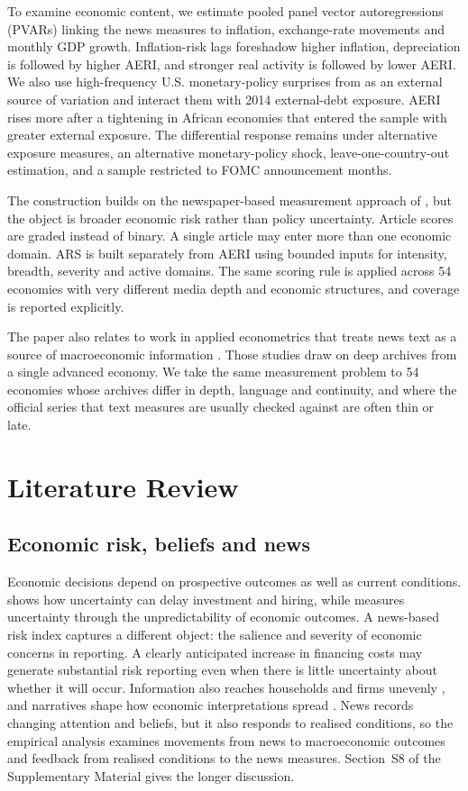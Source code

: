 \documentclass[12pt]{article}
\begin{document}
To examine economic content, we estimate pooled panel vector autoregressions (PVARs) linking the news measures to inflation, exchange-rate movements and monthly GDP growth. Inflation-risk lags foreshadow higher inflation, depreciation is followed by higher AERI, and stronger real activity is followed by lower AERI. We also use high-frequency U.S. monetary-policy surprises from \citet{jarocinski2020} as an external source of variation and interact them with 2014 external-debt exposure. AERI rises more after a tightening in African economies that entered the sample with greater external exposure. The differential response remains under alternative exposure measures, an alternative monetary-policy shock, leave-one-country-out estimation, and a sample restricted to FOMC announcement months.

The construction builds on the newspaper-based measurement approach of \citet{baker2016}, but the object is broader economic risk rather than policy uncertainty. Article scores are graded instead of binary. A single article may enter more than one economic domain. ARS is built separately from AERI using bounded inputs for intensity, breadth, severity and active domains. The same scoring rule is applied across 54 economies with very different media depth and economic structures, and coverage is reported explicitly.

The paper also relates to work in applied econometrics that treats news text as a source of macroeconomic information \citep{thorsrud2020,ellingsen2022,kalamara2022}. Those studies draw on deep archives from a single advanced economy. We take the same measurement problem to 54 economies whose archives differ in depth, language and continuity, and where the official series that text measures are usually checked against are often thin or late.

\section{Literature Review}\label{sec:literature}
\subsection{Economic risk, beliefs and news}
Economic decisions depend on prospective outcomes as well as current conditions. \citet{bloom2009} shows how uncertainty can delay investment and hiring, while \citet{jurado2015} measures uncertainty through the unpredictability of economic outcomes. A news-based risk index captures a different object: the salience and severity of economic concerns in reporting. A clearly anticipated increase in financing costs may generate substantial risk reporting even when there is little uncertainty about whether it will occur. Information also reaches households and firms unevenly \citep{mankiwreis2002}, and narratives shape how economic interpretations spread \citep{shiller2017}. News records changing attention and beliefs, but it also responds to realised conditions, so the empirical analysis examines movements from news to macroeconomic outcomes and feedback from realised conditions to the news measures. Section~S8 of the Supplementary Material gives the longer discussion.
\end{document}
